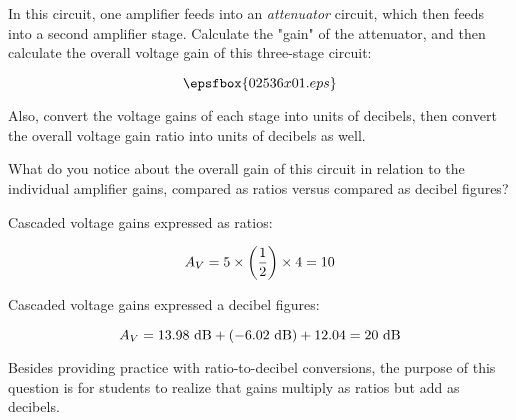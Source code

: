 

In this circuit, one amplifier feeds into an {\it attenuator} circuit, which then feeds into a second amplifier stage.  Calculate the "gain" of the attenuator, and then calculate the overall voltage gain of this three-stage circuit:

$$\epsfbox{02536x01.eps}$$

Also, convert the voltage gains of each stage into units of decibels, then convert the overall voltage gain ratio into units of decibels as well.

What do you notice about the overall gain of this circuit in relation to the individual amplifier gains, compared as ratios versus compared as decibel figures?







Cascaded voltage gains expressed as ratios:

$$A_{V} = 5 \times \left( {1 \over 2} \right) \times 4 = 10$$

Cascaded voltage gains expressed a decibel figures:

$$A_{V} = 13.98 \hbox{ dB} + (-6.02 \hbox{ dB}) + 12.04 = 20 \hbox{ dB}$$







Besides providing practice with ratio-to-decibel conversions, the purpose of this question is for students to realize that gains multiply as ratios but add as decibels.




